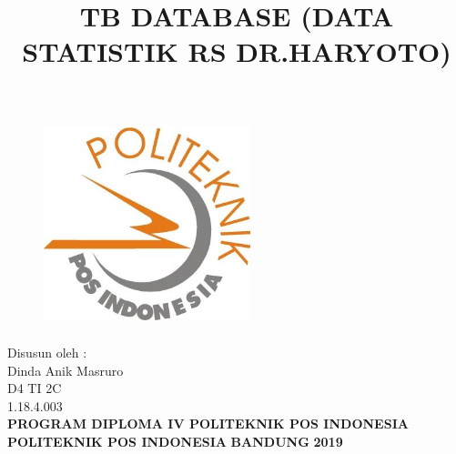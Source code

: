 \documentclass[a4paper, 12pt]{article}
\begin{document}
\title{\huge\textbf{TB DATABASE (DATA STATISTIK RS DR.HARYOTO)}}
\date{}

\maketitle


\begin{figure}[!ht]
\begin{center}
\includegraphics[width = 6cm, height = 6cm]{gambar/poltekpos.jpg}
\end{center}
\end{figure}

\begin{center}
\vspace{1cm}
Disusun oleh :\\
Dinda Anik Masruro\\
D4 TI 2C\\
1.18.4.003\\
\vspace{1cm}
\textbf{PROGRAM DIPLOMA IV POLITEKNIK POS INDONESIA} \linebreak
\textbf{POLITEKNIK POS INDONESIA} \linebreak
\textbf{BANDUNG}\linebreak
\textbf{2019}

\end{center}


\thispagestyle{empty}


\end{document}
